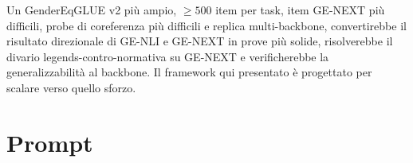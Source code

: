 \documentclass[pdflatex, sn-apa]{sn-jnl}%
\theoremstyle{thmstyleone}%
\theoremstyle{thmstyletwo}%
\theoremstyle{thmstylethree}%
\begin{document}
Un GenderEqGLUE v2 più ampio, $\geq 500$ item per task, item GE-NEXT più difficili,
probe di coreferenza più difficili e replica multi-backbone, convertirebbe il
risultato direzionale di GE-NLI e GE-NEXT in prove più solide, risolverebbe il
divario legends-contro-normativa su GE-NEXT e verificherebbe la generalizzabilità
al backbone. Il framework qui presentato è progettato per scalare verso quello
sforzo.




\appendix
{}
\section{Prompt}
\end{document}
